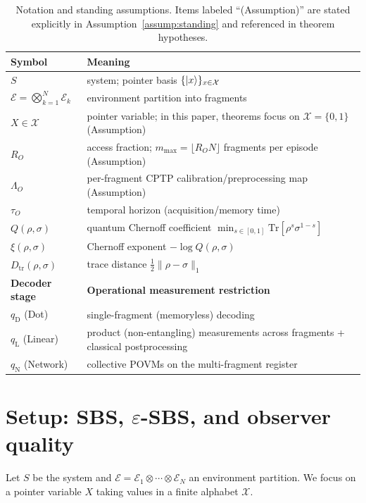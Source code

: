 \documentclass[aps,pra,twocolumn,superscriptaddress,nofootinbib]{revtex4-2}
\newcommand{\cE}{\mathcal{E}}
\newcommand{\cX}{\mathcal{X}}
\newcommand{\Dtr}{D_{\mathrm{tr}}}
\newcommand{\1}{\mathbf{1}}
\newcommand{\QCBcoef}{Q}
\newcommand{\QCBdist}{\xi}
\theoremstyle{definition}
\theoremstyle{plain}
\begin{document}
\begin{table}[t]
\caption{Notation and standing assumptions. Items labeled ``(Assumption)'' are stated explicitly in Assumption~\ref{assump:standing} and referenced in theorem hypotheses.}
\label{tab:notation-assumptions}
\begin{ruledtabular}
\footnotesize
\begin{tabular}{p{}p{}}
\textbf{Symbol} & \textbf{Meaning} \\
\midrule
$S$ & system; pointer basis $\{\ket{x}\}_{x\in\cX}$ \\
$\cE=\bigotimes_{k=1}^N \cE_k$ & environment partition into fragments \\
$X\in\cX$ & pointer variable; in this paper, theorems focus on $\cX=\{0,1\}$ (Assumption) \\
$R_O$ & access fraction; $m_{\max}=\lfloor R_O N\rfloor$ fragments per episode (Assumption) \\
$\Lambda_O$ & per-fragment CPTP calibration/preprocessing map (Assumption) \\
$\tau_O$ & temporal horizon (acquisition/memory time) \\
$\QCBcoef(\rho,\sigma)$ & quantum Chernoff coefficient $\min_{s\in[0,1]}\mathrm{Tr}[\rho^s\sigma^{1-s}]$ \\
$\QCBdist(\rho,\sigma)$ & Chernoff exponent $-\log \QCBcoef(\rho,\sigma)$ \\
$\Dtr(\rho,\sigma)$ & trace distance $\tfrac12\lVert \rho-\sigma\rVert_1$ \\
\midrule
\textbf{Decoder stage} & \textbf{Operational measurement restriction} \\
\midrule
$q_{\mathrm{D}}$ (Dot) & single-fragment (memoryless) decoding \\
$q_{\mathrm{L}}$ (Linear) & product (non-entangling) measurements across fragments + classical postprocessing \\
$q_{\mathrm{N}}$ (Network) & collective POVMs on the multi-fragment register \\
\end{tabular}
\end{ruledtabular}
\end{table}

\section{Setup: SBS, $\varepsilon$-SBS, and observer quality}

Let $S$ be the system and $\cE=\cE_1\otimes\cdots\otimes\cE_N$ an environment partition.
We focus on a pointer variable $X$ taking values in a finite alphabet $\cX$.
\end{document}
